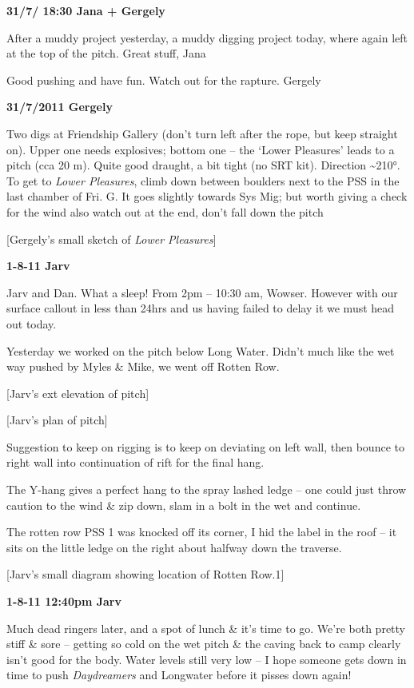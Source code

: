\textbf{31/7/ 18:30 Jana + Gergely}

After a muddy project yesterday, a muddy digging project today, where
again left at the top of the pitch. Great stuff, Jana

Good pushing and have fun. Watch out for the rapture. Gergely

\textbf{31/7/2011 Gergely}

Two digs at Friendship Gallery (don't turn left after the rope, but keep
straight on). Upper one needs explosives; bottom one -- the `Lower
Pleasures' leads to a pitch (cca 20 m). Quite good draught, a bit tight
(no SRT kit). Direction \textasciitilde 210°. To get to \emph{Lower
Pleasures}, climb down between boulders next to the PSS in the last
chamber of Fri. G. It goes slightly towards Sys Mig; but worth giving a
check for the wind also watch out at the end, don't fall down the pitch

{[}Gergely's small sketch of \emph{Lower Pleasures}{]}

\textbf{1-8-11 Jarv}

Jarv and Dan. What a sleep! From 2pm -- 10:30 am, Wowser. However with
our surface callout in less than 24hrs and us having failed to delay it
we must head out today.

Yesterday we worked on the pitch below Long Water. Didn't much like the
wet way pushed by Myles \& Mike, we went off Rotten Row.

{[}Jarv's ext elevation of pitch{]}

{[}Jarv's plan of pitch{]}

Suggestion to keep on rigging is to keep on deviating on left wall, then
bounce to right wall into continuation of rift for the final hang.

The Y-hang gives a perfect hang to the spray lashed ledge -- one could
just throw caution to the wind \& zip down, slam in a bolt in the wet
and continue.

The rotten row PSS 1 was knocked off its corner, I hid the label in the
roof -- it sits on the little ledge on the right about halfway down the
traverse.

{[}Jarv's small diagram showing location of Rotten Row.1{]}

\textbf{1-8-11 12:40pm Jarv}

Much dead ringers later, and a spot of lunch \& it's time to go. We're
both pretty stiff \& sore -- getting so cold on the wet pitch \& the
caving back to camp clearly isn't good for the body. Water levels still
very low -- I hope someone gets down in time to push \emph{Daydreamers}
and Longwater before it pisses down again!

